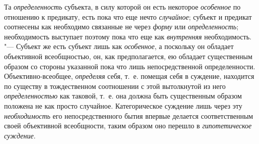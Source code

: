 Та {\em определенность}
субъекта, в силу которой он есть некоторое
{\em особенное} по
отношению к предикату, есть пока что еще нечто
{\em случайное}; субъект
и предикат соотнесены как необходимо связанные не через
{\em форму} или
{\em определенность};
необходимость выступает поэтому пока что еще как
{\em внутренняя}
необходимость. "--- Субъект же есть субъект лишь
как {\em особенное}, а
поскольку он обладает объективной всеобщностью, он, как предполагается, ею
обладает существенным образом со стороны указанной пока что лишь
непосредственной определенности. Объективно-всеобщее,
{\em определяя} себя,
т.~е. помещая себя в суждение, находится по существу в тождественном
соотношении с этой вытолкнутой из него
{\em определенностью} как
таковой, т.~е. она должна быть существенным образом положена не как просто
случайное. Категорическое суждение лишь через эту
{\em необходимость} его
непосредственного бытия впервые делается соответственным своей объективной
всеобщности, таким образом оно перешло в
{\em гипотетическое суждение}.

